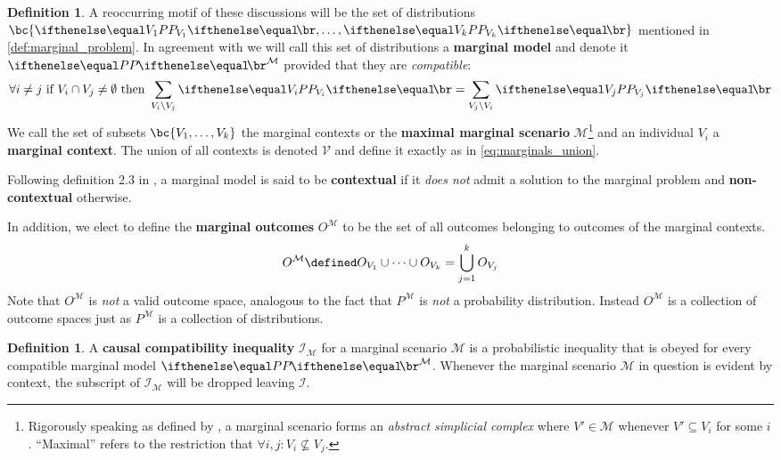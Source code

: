 \documentclass[aps, 10pt, english, twoside, pra, nofootinbib, longbibliography]{revtex4-1}
\theoremstyle{plain}
\theoremstyle{definition}
\newtheorem{definition}[theorem]{Definition}
\theoremstyle{remark}
\newcommand{\term}[1]{\textcolor{Mahogany}{\textbf{#1}}}
\begin{document}
    \begin{definition}
        \label{def:marginal_model}
        A reoccurring motif of these discussions will be the set of distributions $\bc{\prob[V_1], \ldots, \prob[V_k]}$ mentioned in \cref{def:marginal_problem}. In agreement with \cite{Fritz_2011} we will call this set of distributions a \term{marginal model} and denote it $\prob^\mathcal{M}$ provided that they are \textit{compatible}:
        \[ \forall i \neq j \text{ if } V_i \cap V_j \neq \emptyset \text{ then } \sum_{V_i \setminus V_j} \prob[V_i] = \sum_{V_j \setminus V_i} \prob[V_j]  \]
        We call the set of subsets $\bc{V_1, \ldots, V_k}$ the marginal contexts or the \term{maximal marginal scenario} $\mathcal{M}$\footnote{Rigorously speaking as defined by \cite{Fritz_2011}, a marginal scenario forms an \textit{abstract simplicial complex} where $V' \in \mathcal{M}$ whenever $V' \subseteq V_i$ for some $i$. ``Maximal'' refers to the restriction that $\forall i,j : V_i \not \subseteq V_j$.} and an individual $V_i$ a \term{marginal context}. The union of all contexts is denoted $\mathcal{V}$ and define it exactly as in \cref{eq:marginals_union}.

        Following definition 2.3 in \cite{Fritz_2011}, a marginal model is said to be \term{contextual} if it \textit{does not} admit a solution to the marginal problem and \term{non-contextual} otherwise.

        In addition, we elect to define the \term{marginal outcomes} $O^\mathcal{M}$ to be the set of all outcomes belonging to outcomes of the marginal contexts.
        \[ O^\mathcal{M} \defined O_{V_1} \cup \cdots \cup O_{V_k} = \bigcup_{j=1}^{k} O_{V_j} \]
        Note that $O^\mathcal{M}$ is \textit{not} a valid outcome space, analogous to the fact that $P^\mathcal{M}$ is \textit{not} a probability distribution. Instead $O^\mathcal{M}$ is a collection of outcome spaces just as $P^\mathcal{M}$ is a collection of distributions.
    \end{definition}

    \begin{definition}
        A \term{causal compatibility inequality} $\mathcal{I}_{\mathcal{M}}$ for a marginal scenario $\mathcal{M}$ is a probabilistic inequality that is obeyed for every compatible marginal model $\prob^{\mathcal{M}}$. Whenever the marginal scenario $\mathcal{M}$ in question is evident by context, the subscript of $\mathcal{I}_{\mathcal{M}}$ will be dropped leaving $\mathcal{I}$.
    \end{definition}
\end{document}
